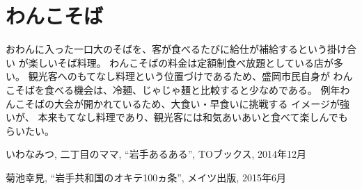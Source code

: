 \documentclass[twocolumn]{jarticle} %
\begin{document}
\section{わんこそば}
おわんに入った一口大のそばを、客が食べるたびに給仕が補給するという掛け合い
が楽しいそば料理。
わんこそばの料金は定額制食べ放題としている店が多い。
観光客へのもてなし料理という位置づけであるため、盛岡市民自身が
わんこそばを食べる機会は、冷麺、じゃじゃ麺と比較すると少なめである。
例年わんこそばの大会が開かれているため、大食い・早食いに挑戦する
イメージが強いが、
本来もてなし料理であり、観光客には和気あいあいと食べて楽しんでもらいたい。



\begin{thebibliography}{9}%

いわなみつ, 二丁目のママ, ``岩手あるある'', TOブックス, 2014年12月

菊池幸見, ``岩手共和国のオキテ100ヵ条'', メイツ出版, 2015年6月
\end{thebibliography}
\end{document}
